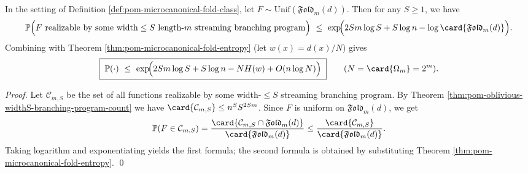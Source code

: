 \begin{theorem}\label{thm:pom-microcanonical-streaming-program-rarity}
In the setting of Definition \ref{def:pom-microcanonical-fold-class}, let \(F\sim\mathrm{Unif}(\mathfrak{Fold}_m(d))\).
Then for any \(S\ge 1\), we have
\[
\mathbb{P}\Bigl(F\ \text{realizable by some width}\le S\ \text{length-}m\ \text{streaming branching program}\Bigr)
\ \le\
\exp\!\Bigl(2Sm\log S+S\log n-\log\card{\mathfrak{Fold}_m(d)}\Bigr).
\]
Combining with Theorem \ref{thm:pom-microcanonical-fold-entropy} (let \(w(x)=d(x)/N\)) gives
\[
\boxed{\;
\mathbb{P}(\cdot)
\ \le\
\exp\!\Bigl(2Sm\log S+S\log n-NH(w)+O(n\log N)\Bigr)\;}
\qquad(N=\card{\Omega_m}=2^m).
\]
\end{theorem}
\begin{proof}
Let \(\mathcal{C}_{m,S}\) be the set of all functions realizable by some width-\(\le S\) streaming branching program.
By Theorem \ref{thm:pom-oblivious-widthS-branching-program-count} we have
\(
\card{\mathcal{C}_{m,S}}\le n^S S^{2Sm}
\).
Since \(F\) is uniform on \(\mathfrak{Fold}_m(d)\), we get
\[
\mathbb{P}(F\in\mathcal{C}_{m,S})
=\frac{\card{\mathcal{C}_{m,S}\cap\mathfrak{Fold}_m(d)}}{\card{\mathfrak{Fold}_m(d)}}
\le \frac{\card{\mathcal{C}_{m,S}}}{\card{\mathfrak{Fold}_m(d)}}.
\]
Taking logarithm and exponentiating yields the first formula; the second formula is obtained by substituting Theorem \ref{thm:pom-microcanonical-fold-entropy}. \qed
\end{proof}

